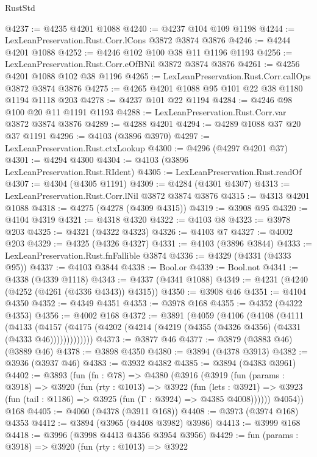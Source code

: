 \begin{lexlean}{RustStd}
\begin{coremodule}
{\begin{coremodule}
{{{{{{{{{{{{{{{{{{{{{{{{{{{{{{{{@4237 := @4235 @4201 @1088
@4240 := @4237 @104 @109 @1198
@4244 := LexLeanPreservation.Rust.Corr.lCons @3872 @3874 @3876
@4246 := @4244 @4201 @1088
@4252 := @4246 @102 @100 @38 @11 @1196 @1193
@4256 := LexLeanPreservation.Rust.Corr.eOfBNil @3872 @3874 @3876
@4261 := @4256 @4201 @1088 @102 @38 @1196
@4265 := LexLeanPreservation.Rust.Corr.callOps @3872 @3874 @3876
@4275 := @4265 @4201 @1088 @95 @101 @22 @38 @1180 @1194 @1118 @203
@4278 := @4237 @101 @22 @1194
@4284 := @4246 @98 @100 @20 @11 @1191 @1193
@4288 := LexLeanPreservation.Rust.Corr.var @3872 @3874 @3876
@4289 := @4288 @4201
@4294 := @4289 @1088 @37 @20 @37 @1191
@4296 := @4103 (@3896 @3970)
@4297 := LexLeanPreservation.Rust.ctxLookup
@4300 := @4296 (@4297 @4201 @37)
@4301 := @4294 @4300
@4304 := @4103 (@3896 LexLeanPreservation.Rust.RIdent)
@4305 := LexLeanPreservation.Rust.readOf
@4307 := @4304 (@4305 @1191)
@4309 := @4284 (@4301 @4307)
@4313 := LexLeanPreservation.Rust.Corr.lNil @3872 @3874 @3876
@4315 := @4313 @4201 @1088
@4318 := @4275 (@4278 (@4309 @4315))
@4319 := @3908 @95
@4320 := @4104 @4319
@4321 := @4318 @4320
@4322 := @4103 @8
@4323 := @3978 @203
@4325 := @4321 (@4322 @4323)
@4326 := @4103 @7
@4327 := @4002 @203
@4329 := @4325 (@4326 @4327)
@4331 := @4103 (@3896 @3844)
@4333 := LexLeanPreservation.Rust.fnFallible @3874
@4336 := @4329 (@4331 (@4333 @95))
@4337 := @4103 @3844
@4338 := Bool.or
@4339 := Bool.not
@4341 := @4338 (@4339 @1118)
@4343 := @4337 (@4341 @1088)
@4349 := @4231 (@4240 (@4252 (@4261 (@4336 @4343)) @4315))
@4350 := @3908 @46
@4351 := @4104 @4350
@4352 := @4349 @4351
@4353 := @3978 @168
@4355 := @4352 (@4322 @4353)
@4356 := @4002 @168
@4372 := @3891
    (@4059
      (@4106
        (@4108
          (@4111
            (@4133
              (@4157 (@4175 (@4202 (@4214 (@4219 (@4355 (@4326 @4356) (@4331 (@4333 @46)))))))))))))
@4373 := @3877 @46
@4377 := @3879 (@3883 @46) (@3889 @46)
@4378 := @3898 @4350
@4380 := @3894 (@4378 @3913)
@4382 := @3936 (@3937 @46)
@4383 := @3932 @4382
@4385 := @3894 (@4383 @3961)
@4402 := @3893
    (fun (fn : @78) =>
    @4380
      (@3916
        (@3919
          (fun (params : @3918) =>
          @3920
            (fun (rty : @1013) =>
            @3922
              (fun (lets : @3921) =>
              @3923 (fun (tail : @1186) => @3925 (fun (Γ : @3924) => @4385 @4008))))))
        @4054))
    @168
@4405 := @4060 (@4378 (@3911 @168))
@4408 := @3973 (@3974 @168) @4353
@4412 := @3894 (@3965 (@4408 @3982) @3986)
@4413 := @3999 @168
@4418 := @3996 (@3998 @4413 @4356 @3954 @3956)
@4429 := fun (params : @3918) =>
  @3920
    (fun (rty : @1013) =>
    @3922
}}}}}}}}}}}}}}}}}}}}}}}}}}}}}}}}
\end{coremodule}}
\end{coremodule}
\end{lexlean}
